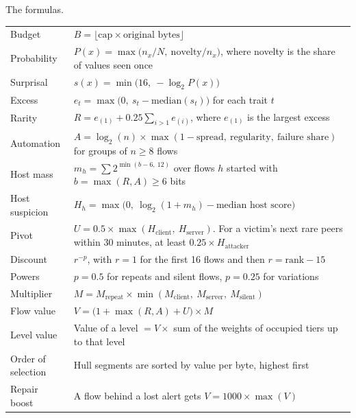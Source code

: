 \begin{gtable}{The formulas.}
\renewcommand{\arraystretch}{1.7}
\begin{tabularx}{\linewidth}{l L}
\toprule
{} & \\
\midrule
Budget & $B = \lfloor \text{cap} \times \text{original bytes} \rfloor$\\
Probability & $P(x) = \max\bigl(n_x/N,\ \text{novelty}/n_x\bigr)$, where novelty is the share of values seen once\\
Surprisal & $s(x) = \min\bigl(16,\ -\log_2 P(x)\bigr)$\\
Excess & $e_t = \max\bigl(0,\ s_t - \text{median}(s_t)\bigr)$ for each trait $t$\\
Rarity & $R = e_{(1)} + 0.25 \sum_{i>1} e_{(i)}$, where $e_{(1)}$ is the largest excess\\
Automation & $A = \log_2(n) \times \max(1-\text{spread},\ \text{regularity},\ \text{failure share})$ for groups of $n \ge 8$ flows\\
Host mass & $m_h = \sum 2^{\min(b-6,\ 12)}$ over flows $h$ started with $b = \max(R,A) \ge 6$ bits\\
Host suspicion & $H_h = \max\bigl(0,\ \log_2(1+m_h) - \text{median host score}\bigr)$\\
Pivot & $U = 0.5 \times \max(H_{\text{client}},\ H_{\text{server}})$. For a victim's next rare peers within 30 minutes, at least $0.25 \times H_{\text{attacker}}$\\
Discount & $r^{-p}$, with $r = 1$ for the first 16 flows and then $r = \text{rank} - 15$\\
Powers & $p = 0.5$ for repeats and silent flows, $p = 0.25$ for variations\\
Multiplier & $M = M_{\text{repeat}} \times \min(M_{\text{client}},\ M_{\text{server}},\ M_{\text{silent}})$\\
Flow value & $V = \bigl(1 + \max(R, A) + U\bigr) \times M$\\
Level value & Value of a level $= V \times$ sum of the weights of occupied tiers up to that level\\
Order of selection & Hull segments are sorted by value per byte, highest first\\
Repair boost & A flow behind a lost alert gets $V = 1000 \times \max(V)$\\
\bottomrule
\end{tabularx}
\end{gtable}

